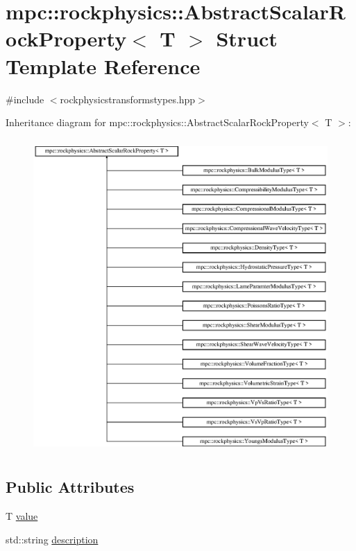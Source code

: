 \hypertarget{structmpc_1_1rockphysics_1_1_abstract_scalar_rock_property}{}\section{mpc\+:\+:rockphysics\+:\+:Abstract\+Scalar\+Rock\+Property$<$ T $>$ Struct Template Reference}
\label{structmpc_1_1rockphysics_1_1_abstract_scalar_rock_property}


{\ttfamily \#include $<$rockphysicstransformstypes.\+hpp$>$}

Inheritance diagram for mpc\+:\+:rockphysics\+:\+:Abstract\+Scalar\+Rock\+Property$<$ T $>$\+:\begin{figure}[H]
\begin{center}
\leavevmode
\includegraphics[height=12.000000cm]{structmpc_1_1rockphysics_1_1_abstract_scalar_rock_property}
\end{center}
\end{figure}
\subsection*{Public Attributes}
\begin{DoxyCompactItemize}
\item 
T \mbox{\hyperlink{structmpc_1_1rockphysics_1_1_abstract_scalar_rock_property_a168ef2a7823a3f35280ec408925c58d7}{value}}
\item 
std\+::string \mbox{\hyperlink{structmpc_1_1rockphysics_1_1_abstract_scalar_rock_property_a3a7ab83e4a29f651a6922e2272a28fae}{description}}
\end{DoxyCompactItemize}


